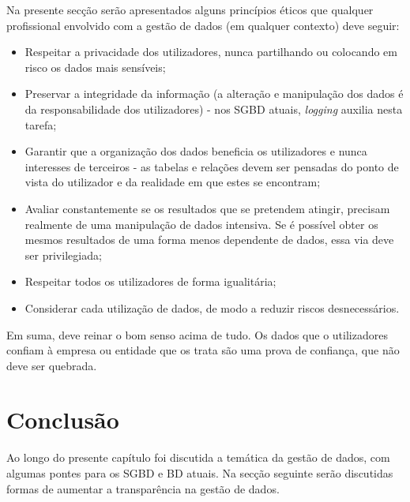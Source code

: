 Na presente secção serão apresentados alguns princípios éticos \cite{principios} que qualquer profissional envolvido com a gestão de dados (em qualquer contexto) deve seguir:

\begin{itemize}
    \item Respeitar a privacidade dos utilizadores, nunca partilhando ou colocando em risco os dados mais sensíveis;
    \item Preservar a integridade da informação (a alteração e manipulação dos dados é da responsabilidade dos utilizadores) - nos \ac{SGBD} atuais, \textit{logging} auxilia nesta tarefa;
    \item Garantir que a organização dos dados beneficia os utilizadores e nunca interesses de terceiros - as tabelas e relações devem ser pensadas do ponto de vista do utilizador e da realidade em que estes se encontram;
    \item Avaliar constantemente se os resultados que se pretendem atingir, precisam realmente de uma manipulação de dados intensiva. Se é possível obter os mesmos resultados de uma forma menos dependente de dados, essa via deve ser privilegiada;
    \item Respeitar todos os utilizadores de forma igualitária;
    \item Considerar cada utilização de dados, de modo a reduzir riscos desnecessários.
\end{itemize}

Em suma, deve reinar o bom senso acima de tudo. Os dados que o utilizadores confiam à empresa ou entidade que os trata são uma prova de confiança, que não deve ser quebrada. 

\section{Conclusão}
\label{chap2:conclusao}
Ao longo do presente capítulo foi discutida a temática da gestão de dados, com algumas pontes para os \ac{SGBD} e \ac{BD} atuais. Na secção seguinte serão discutidas formas de aumentar a transparência na gestão de dados.
